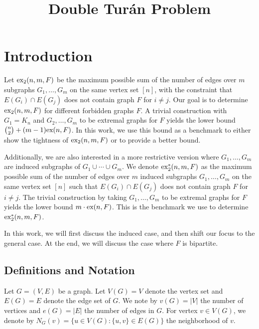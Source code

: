 \documentclass[12pt]{report}
\title{Double Turán Problem}
\newcommand*{\ex}{\textnormal{ex}}
\newcommand*{\dex}{\textnormal{ex}_2}
\newcommand*{\dexind}{\textnormal{ex}_2^*}
\begin{document}
\maketitle



\tableofcontents

\chapter{Introduction}

Let $\dex(n, m, F)$ be the maximum possible sum of the number of edges over $m$ subgraphs $G_1, \ldots, G_m$ on the same vertex set $[n]$, with the constraint that $E(G_i) \cap E(G_j)$ does not contain graph $F$ for $i \neq j$. Our goal is to determine $\dex(n, m, F)$ for different forbidden graphs $F$. A trivial construction with $G_1 = K_n$ and $G_2, \ldots, G_m$ to be extremal graphs for $F$ yields the lower bound $\binom{n}{2} + (m - 1)\ex(n, F)$. In this work, we use this bound as a benchmark to either show the tightness of $\dex(n, m, F)$ or to provide a better bound.

Additionally, we are also interested in a more restrictive version where $G_1, \ldots, G_m$ are induced subgraphs of $G_1 \cup \cdots \cup G_m$. We denote $\dexind(n, m, F)$ as the maximum possible sum of the number of edges over $m$ induced subgraphs $G_1, \ldots, G_m$ on the same vertex set $[n]$ such that $E(G_i) \cap E(G_j)$ does not contain graph $F$ for $i \neq j$. The trivial construction by taking $G_1, \ldots, G_m$ to be extremal graphs for $F$ yields the lower bound $m \cdot \ex(n, F)$. This is the benchmark we use to determine $\dexind(n, m, F)$.

In this work, we will first discuss the induced case, and then shift our focus to the general case. At the end, we will discuss the case where $F$ is bipartite.

\section{Definitions and Notation}
Let $G = (V, E)$ be a graph. Let $V(G) = V$ denote the vertex set and $E(G) = E$ denote the edge set of $G$. We note by $v(G) = |V|$ the number of vertices and $e(G) = |E|$ the number of edges in $G$. For vertex $v \in V(G)$, we denote by $N_G(v) = \{u \in V(G) : \{u, v\} \in E(G)\}$ the neighborhood of $v$.
\end{document}
